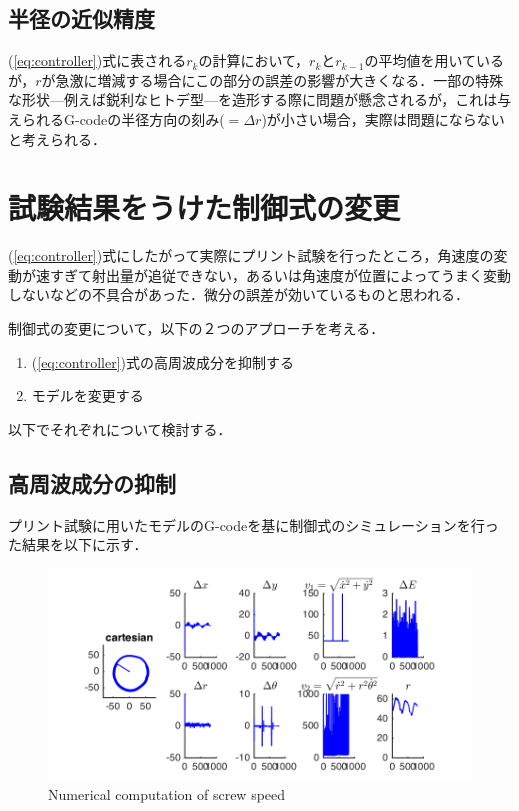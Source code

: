 \documentclass[twocolumn,oneside,a4paper]{article}
\begin{document}
\subsection{半径の近似精度}
(\ref{eq:controller})式に表される$r_k$の計算において，$r_k$と$r_{k-1}$の平均値を用いているが，$r$が急激に増減する場合にこの部分の誤差の影響が大きくなる．一部の特殊な形状—例えば鋭利なヒトデ型—を造形する際に問題が懸念されるが，これは与えられるG-codeの半径方向の刻み($ = \Delta r$)が小さい場合，実際は問題にならないと考えられる．


\section{試験結果をうけた制御式の変更}
(\ref{eq:controller})式にしたがって実際にプリント試験を行ったところ，角速度の変動が速すぎて射出量が追従できない，あるいは角速度が位置によってうまく変動しないなどの不具合があった．微分の誤差が効いているものと思われる．

制御式の変更について，以下の２つのアプローチを考える．

\begin{enumerate}
     \item (\ref{eq:controller})式の高周波成分を抑制する
     \item モデルを変更する
\end{enumerate}

以下でそれぞれについて検討する．
\subsection{高周波成分の抑制}
プリント試験に用いたモデルのG-codeを基に制御式のシミュレーションを行った結果を以下に示す．

\begin{figure}[htbp]
    \includegraphics[bb=0 0 432 216,width=1\columnwidth]{gcodesim.png}
    \caption{Numerical computation of screw speed}
    \label{fig:noise}
\end{figure}
\end{document}
